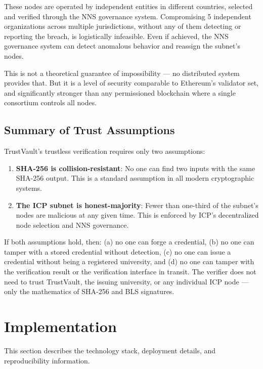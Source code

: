 \documentclass[conference]{IEEEtran}
\begin{document}
These nodes are operated by independent entities in different countries, selected and verified through the NNS governance system. Compromising 5 independent organizations across multiple jurisdictions, without any of them detecting or reporting the breach, is logistically infeasible. Even if achieved, the NNS governance system can detect anomalous behavior and reassign the subnet's nodes.

This is not a theoretical guarantee of impossibility — no distributed system provides that. But it is a level of security comparable to Ethereum's validator set, and significantly stronger than any permissioned blockchain where a single consortium controls all nodes.

\subsection{Summary of Trust Assumptions}

TrustVault's trustless verification requires only two assumptions:
\begin{enumerate}
  \item \textbf{SHA-256 is collision-resistant}: No one can find two inputs with the same SHA-256 output. This is a standard assumption in all modern cryptographic systems.
  \item \textbf{The ICP subnet is honest-majority}: Fewer than one-third of the subnet's nodes are malicious at any given time. This is enforced by ICP's decentralized node selection and NNS governance.
\end{enumerate}

If both assumptions hold, then: (a) no one can forge a credential, (b) no one can tamper with a stored credential without detection, (c) no one can issue a credential without being a registered university, and (d) no one can tamper with the verification result or the verification interface in transit. The verifier does not need to trust TrustVault, the issuing university, or any individual ICP node — only the mathematics of SHA-256 and BLS signatures.

\section{Implementation}
\label{sec:impl}

This section describes the technology stack, deployment details, and reproducibility information.
\end{document}
